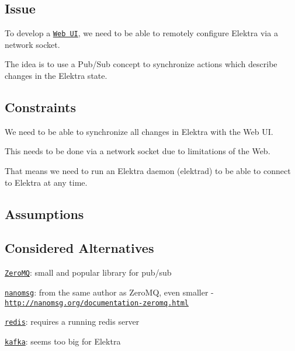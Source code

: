 \subsection*{Issue}

To develop a \href{https://github.com/ElektraInitiative/libelektra/issues/252}{\tt Web UI}, we need to be able to remotely configure Elektra via a network socket.

The idea is to use a Pub/\+Sub concept to synchronize actions which describe changes in the Elektra state.

\subsection*{Constraints}


\begin{DoxyItemize}
\item We need to be able to synchronize all changes in Elektra with the Web UI.
\item This needs to be done via a network socket due to limitations of the Web.
\item That means we need to run an Elektra daemon ({\ttfamily elektrad}) to be able to connect to Elektra at any time.
\end{DoxyItemize}

\subsection*{Assumptions}

\subsection*{Considered Alternatives}


\begin{DoxyItemize}
\item \href{http://zeromq.org/}{\tt Zero\+MQ}\+: small and popular library for pub/sub
\item \href{http://nanomsg.org/}{\tt nanomsg}\+: from the same author as Zero\+MQ, even smaller -\/ \href{http://nanomsg.org/documentation-zeromq.html}{\tt http\+://nanomsg.\+org/documentation-\/zeromq.\+html}
\item \href{http://redis.io/topics/pubsub}{\tt redis}\+: requires a running redis server
\item \href{http://kafka.apache.org/}{\tt kafka}\+: seems too big for Elektra
\end{DoxyItemize}

